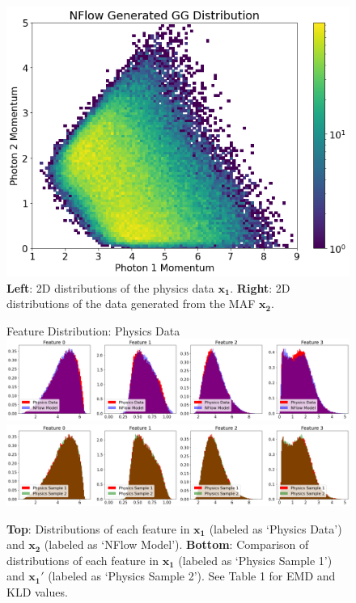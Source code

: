 \begin{figure}[!ht]
\begin{minipage}{0.4\textwidth}
        \includegraphics[width=.9\textwidth,trim={0 0 0 0},clip]{pictures/milestoneR2/nflow2.png}
    \end{minipage}
    \caption{\textbf{Left}: 2D distributions of the physics data $\mathbf{x_1}$. \textbf{Right}: 2D distributions of the data generated from the MAF $\mathbf{x_2}$.}
    \label{fig:a}
\end{figure}

\begin{figure}[!ht]
    \centering
    \begin{minipage}{1\textwidth}
    Feature Distribution: Physics Data
        \centering
        \includegraphics[width=.9\textwidth,trim={0 0 0 0},clip]{pictures/milestoneR2/comp1.png}
        \includegraphics[width=.9\textwidth,trim={0 0 0 0},clip]{pictures/milestoneR2/comp2.png}
    \end{minipage}%
    \caption{\textbf{Top}: Distributions of each feature in $\mathbf{x_1}$ (labeled as `Physics Data') and $\mathbf{x_2}$ (labeled as `NFlow Model'). \textbf{Bottom}: Comparison of distributions of each feature in $\mathbf{x_1}$ (labeled as `Physics Sample 1') and $\mathbf{x_1'}$ (labeled as `Physics Sample 2'). See Table 1 for EMD and KLD values.}
    \label{fig:b}
\end{figure}



